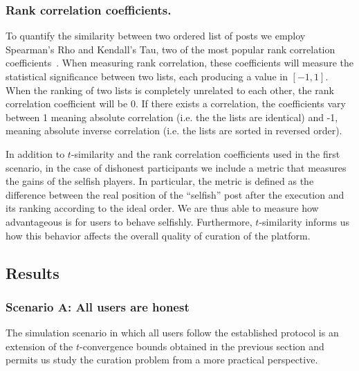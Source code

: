     \subsubsection*{Rank correlation coefficients.}
      To quantify the similarity between two ordered list of posts we employ
      Spearman's Rho and Kendall's Tau, two of the most popular rank correlation
      coefficients~\cite{kendall1955rank}. When measuring rank correlation,
      these coefficients will measure the statistical significance between two
      lists, each producing a value in $\left[-1, 1\right]$. When the ranking of
      two lists is completely unrelated to each other, the rank correlation
      coefficient will be 0. If there exists a correlation, the coefficients
      vary between 1 meaning absolute correlation (i.e. the the lists are
      identical) and -1, meaning absolute inverse correlation (i.e. the lists
      are sorted in reversed order).

    In addition to $t$-similarity and the rank correlation coefficients used in
    the first scenario, in the case of dishonest participants we include a
    metric that measures the gains of the selfish players. In particular, the
    metric is defined as the difference between the real position of the
    ``selfish'' post after the execution and its ranking according to the ideal
    order. We are thus able to measure how advantageous is for users to behave
    selfishly.  Furthermore, $t$-similarity informs us how this behavior
    affects the overall quality of curation of the platform.

  \subsection{Results}

    \subsubsection*{Scenario A: All users are honest}
      The simulation scenario in which all users follow the established protocol
      is an extension of the $t$-convergence bounds obtained in the previous
      section and permits us study the curation problem from a more practical
      perspective.

